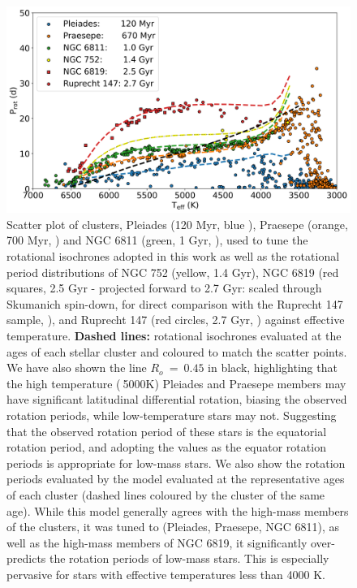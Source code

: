\begin{figure}
\centering
 \includegraphics[width=\textwidth]{Figures/rot_gap_figures/com_gap_clus.png}
 \caption[Cluster rotation periods distributions against effective temperature.]{Scatter plot of clusters, Pleiades (120 Myr, blue \citep{rebull_rotation_2016}), Praesepe (orange, 700 Myr, \citep{douglas_poking_2017, douglas_k2_2019}) and NGC 6811 (green, 1 Gyr, \citep{curtis_temporary_2019}), used to tune the rotational isochrones adopted in this work \citep{spada_competing_2020} as well as the rotational period distributions of NGC 752 (yellow, 1.4 Gyr), NGC 6819 (red squares, 2.5 Gyr - projected forward to 2.7 Gyr: scaled through Skumanich spin-down, for direct comparison with the Ruprecht 147 sample, \citep{meibom_kepler_2011}), and Ruprecht 147 (red circles, 2.7 Gyr, \citep{curtis_when_2020}) against effective temperature. \textbf{Dashed lines:} \citep{spada_competing_2020} rotational isochrones evaluated at the ages of each stellar cluster and coloured to match the scatter points. We have also shown the line $R_o \ = \ 0.45$ in black, highlighting that the high temperature ($\>$5000K) Pleiades and Praesepe members may have significant latitudinal differential rotation, biasing the observed rotation periods, while low-temperature stars may not. Suggesting that the observed rotation period of these stars is the equatorial rotation period, and adopting the \citet{spada_competing_2020} values as the equator rotation periods is appropriate for low-mass stars. We also show the rotation periods evaluated by the \citet{spada_competing_2020} model evaluated at the representative ages of each cluster (dashed lines coloured by the cluster of the same age).
While this model generally agrees with the high-mass members of the clusters, it was tuned to (Pleiades, Praesepe, NGC 6811), as well as the high-mass members of NGC 6819, it significantly over-predicts the rotation periods of low-mass stars.
This is especially pervasive for stars with effective temperatures less than 4000 K.}
 \label{fig:com_gap_clus}
\end{figure}

